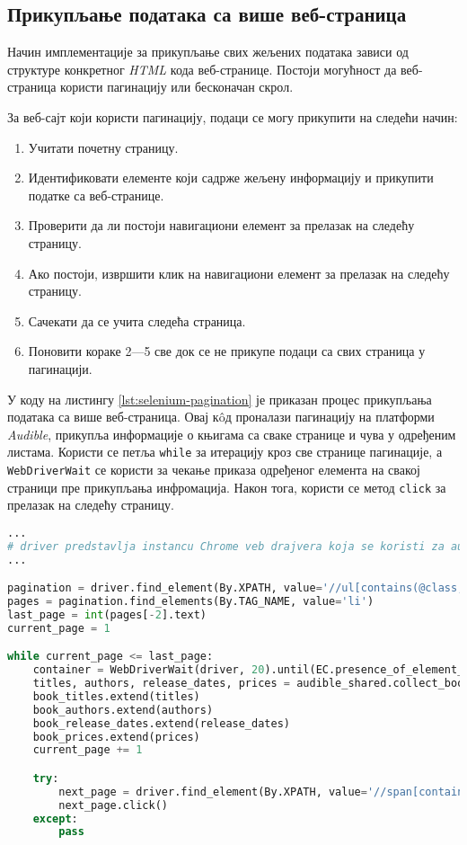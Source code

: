 \documentclass[12pt,oneside]{memoir}
\begin{document}
\subsection{Прикупљање података са више веб-страница}
Начин имплементације за прикупљање свих жељених података зависи од структуре конкретног 
\textit{HTML} кода веб-странице. Постоји могућност да веб-страница користи пагинацију или бесконачан скрол.

За веб-сајт који користи пагинацију, подаци се могу прикупити на следећи начин:
\begin{enumerate}
  \item Учитати почетну страницу.
  \item Идентификовати елементе који садрже жељену информацију и прикупити податке са веб-странице.
  \item Проверити да ли постоји навигациони елемент за прелазак на следећу страницу.
  \item Ако постоји, извршити клик на навигациони елемент за прелазак на следећу страницу.
  \item Сачекати да се учита следећа страница.
  \item Поновити кораке 2---5 све док се не прикупе подаци са свих страница у пагинацији.
\end{enumerate}

У коду на листингу \ref{lst:selenium-pagination} је приказан процес прикупљања података са више веб-страница. Овај кôд проналази пагинацију на платформи \textit{Audible}, прикупља информације о књигама са сваке странице и чува у одређеним листама. Користи се петља \texttt{while} за итерацију кроз све странице пагинације, а \texttt{WebDriverWait} се користи за чекање приказа одређеног елемента на свакој страници пре прикупљања инфромација. Након тога, користи се метод \texttt{click} за прелазак на следећу страницу.

\begin{lstlisting}[language=Python, caption={Пагинација у оквиру библиотеке \textit{Selenium}}, label={lst:selenium-pagination}]
...
# driver predstavlja instancu Chrome veb drajvera koja se koristi za automatizaciju pregledaca
...

pagination = driver.find_element(By.XPATH, value='//ul[contains(@class, "pagingElements")]')
pages = pagination.find_elements(By.TAG_NAME, value='li')
last_page = int(pages[-2].text)
current_page = 1

while current_page <= last_page:
    container = WebDriverWait(driver, 20).until(EC.presence_of_element_located((By.CLASS_NAME, 'adbl-impression-container ')))
    titles, authors, release_dates, prices = audible_shared.collect_books_info(container)
    book_titles.extend(titles)
    book_authors.extend(authors)
    book_release_dates.extend(release_dates)
    book_prices.extend(prices)
    current_page += 1

    try:
        next_page = driver.find_element(By.XPATH, value='//span[contains(@class, "nextButton")]')
        next_page.click()
    except: 
        pass
\end{lstlisting}
\end{document}
